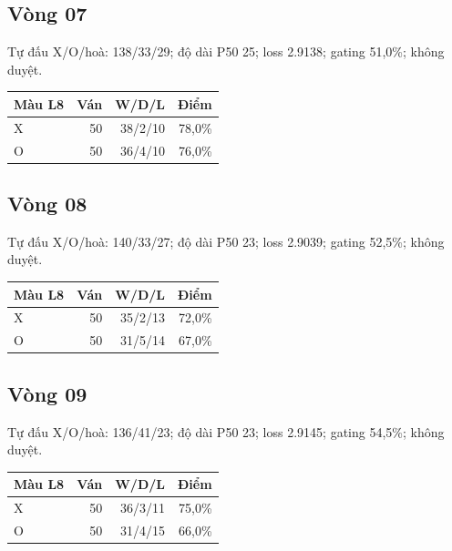 \subsection*{Vòng 07}

Tự đấu X/O/hoà: 138/33/29; độ dài P50 25; loss 2.9138; gating 51,0\%; không duyệt.

\begin{center}\scriptsize\begin{tabular}{@{}lrrr@{}}\toprule

Màu L8 & Ván & W/D/L & Điểm \\

\midrule

X & 50 & 38/2/10 & 78,0\% \\

O & 50 & 36/4/10 & 76,0\% \\

\bottomrule\end{tabular}\end{center}

\subsection*{Vòng 08}

Tự đấu X/O/hoà: 140/33/27; độ dài P50 23; loss 2.9039; gating 52,5\%; không duyệt.

\begin{center}\scriptsize\begin{tabular}{@{}lrrr@{}}\toprule

Màu L8 & Ván & W/D/L & Điểm \\

\midrule

X & 50 & 35/2/13 & 72,0\% \\

O & 50 & 31/5/14 & 67,0\% \\

\bottomrule\end{tabular}\end{center}

\subsection*{Vòng 09}

Tự đấu X/O/hoà: 136/41/23; độ dài P50 23; loss 2.9145; gating 54,5\%; không duyệt.

\begin{center}\scriptsize\begin{tabular}{@{}lrrr@{}}\toprule

Màu L8 & Ván & W/D/L & Điểm \\

\midrule

X & 50 & 36/3/11 & 75,0\% \\

O & 50 & 31/4/15 & 66,0\% \\

\bottomrule\end{tabular}\end{center}

